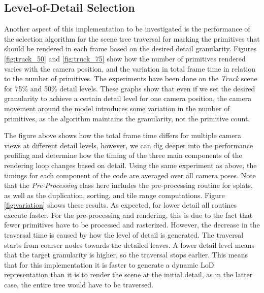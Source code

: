 \subsection{Level-of-Detail Selection}
Another aspect of this implementation to be investigated is the performance of the selection algorithm for the scene tree traversal for marking the primitives that should be rendered in each frame based on the desired detail granularity. Figures \ref{fig:truck_50} and \ref{fig:truck_75} show how the number of primitives rendered varies with the camera position, and the variation in total frame time in relation to the number of primitives. The experiments have been done on the \textit{Truck} scene for 75\% and 50\% detail levels. These graphs show that even if we set the desired granularity to achieve a certain detail level for one camera position, the camera movement around the model introduces some variation in the number of primitives, as the algorithm maintains the granularity, not the primitive count.

\begin{figure}[H]
\end{figure}

The figure above shows how the total frame time differs for multiple camera views at different detail levels, however, we can dig deeper into the performance profiling and determine how the timing of the three main components of the rendering loop changes based on detail. Using the same experiment as above, the timings for each component of the code are averaged over all camera poses. Note that the \textit{Pre-Processing} class here includes the pre-processing routine for splats, as well as the duplication, sorting, and tile range computations. Figure \ref{fig:variation} shows these results. As expected, for lower detail all routines execute faster. For the pre-processing and rendering, this is due to the fact that fewer primitives have to be processed and rasterized. However, the decrease in the traversal time is caused by how the level of detail is generated. The traversal starts from coarser nodes towards the detailed leaves. A lower detail level means that the target granularity is higher, so the traversal stops earlier. This means that for this implementation it is faster to generate a dynamic LoD representation than it is to render the scene at the initial detail, as in the latter case, the entire tree would have to be traversed.


